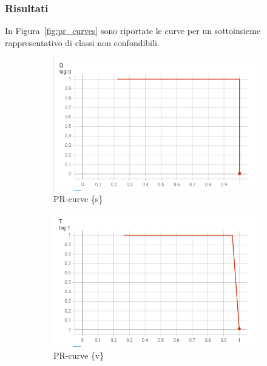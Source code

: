 \subsubsection*{Risultati}
In Figura~\ref{fig:pr_curves} sono riportate le curve per un sottoinsieme rappresentativo di classi non confondibili.

\begin{figure}[htbp]
    \centering
    \begin{subfigure}[t]{0.32\textwidth}
        \centering
        \includegraphics[width=\textwidth]{images/pr_curve1.png}
        \caption{PR-curve \{s\}}
    \end{subfigure}
    \begin{subfigure}[t]{0.32\textwidth}
        \centering
        \includegraphics[width=\textwidth]{images/pr_curve2.png}
        \caption{PR-curve \{v\}}
    \end{subfigure}
    \begin{subfigure}[t]{0.32\textwidth}

\end{subfigure}
\end{figure}
